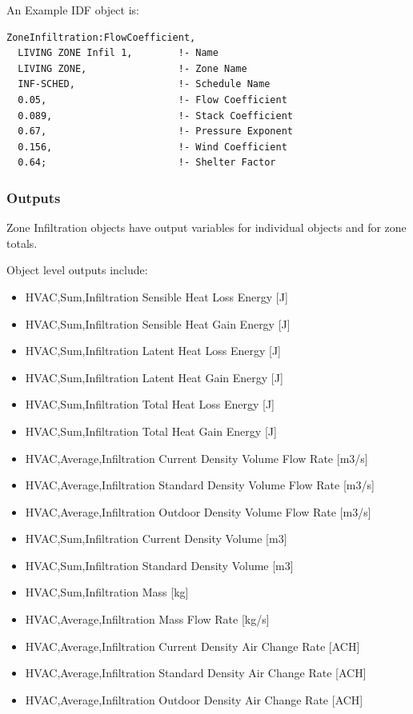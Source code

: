 An Example IDF object is:

\begin{lstlisting}
ZoneInfiltration:FlowCoefficient,
  LIVING ZONE Infil 1,        !- Name
  LIVING ZONE,                !- Zone Name
  INF-SCHED,                  !- Schedule Name
  0.05,                       !- Flow Coefficient
  0.089,                      !- Stack Coefficient
  0.67,                       !- Pressure Exponent
  0.156,                      !- Wind Coefficient
  0.64;                       !- Shelter Factor
\end{lstlisting}

\subsubsection{Outputs}\label{outputs-003}

Zone Infiltration objects have output variables for individual objects and for zone totals.

Object level outputs include:

\begin{itemize}
\item
  HVAC,Sum,Infiltration Sensible Heat Loss Energy {[}J{]}
\item
  HVAC,Sum,Infiltration Sensible Heat Gain Energy {[}J{]}
\item
  HVAC,Sum,Infiltration Latent Heat Loss Energy {[}J{]}
\item
  HVAC,Sum,Infiltration Latent Heat Gain Energy {[}J{]}
\item
  HVAC,Sum,Infiltration Total Heat Loss Energy {[}J{]}
\item
  HVAC,Sum,Infiltration Total Heat Gain Energy {[}J{]}
\item
  HVAC,Average,Infiltration Current Density Volume Flow Rate {[}m3/s{]}
\item
  HVAC,Average,Infiltration Standard Density Volume Flow Rate {[}m3/s{]}
\item
  HVAC,Average,Infiltration Outdoor Density Volume Flow Rate {[}m3/s{]}
\item
  HVAC,Sum,Infiltration Current Density Volume {[}m3{]}
\item
  HVAC,Sum,Infiltration Standard Density Volume {[}m3{]}
\item
  HVAC,Sum,Infiltration Mass {[}kg{]}
\item
  HVAC,Average,Infiltration Mass Flow Rate {[}kg/s{]}
\item
  HVAC,Average,Infiltration Current Density Air Change Rate {[}ACH{]}
\item
  HVAC,Average,Infiltration Standard Density Air Change Rate {[}ACH{]}
\item
  HVAC,Average,Infiltration Outdoor Density Air Change Rate {[}ACH{]}
\end{itemize}


